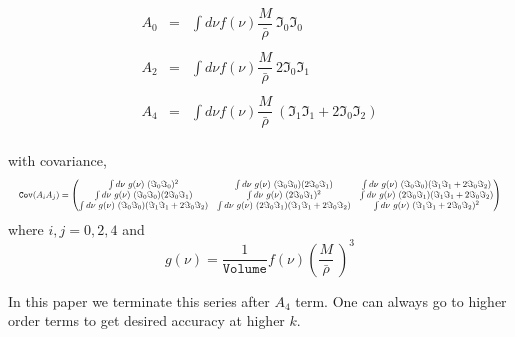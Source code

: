 \documentclass[
  11pt,
  twoside,
  openright,
  titlepage,
  headings=optiontoheadandtoc
]{scrbook}
\begin{document}
\clearpage

\begin{equation}
\begin{array}{lcl} 
A_0 & = & \int d\nu f(\nu) \dfrac{M}{\bar{\rho}}\ \Im_0\Im_0 \\ 
\\
A_2 & = & \int d\nu f(\nu) \dfrac{M}{\bar{\rho}}\ 2\Im_0\Im_1 \\ 
\\
A_4 & = & \int d\nu f(\nu) \dfrac{M}{\bar{\rho}}\ (\Im_1\Im_1 + 2\Im_0 \Im_2)
\end{array}
\label{p2:A024}
\end{equation}
\\
with covariance,
\\
\begin{equation}
\resizebox{\linewidth}{!}{$\displaystyle
\mathtt{Cov}(A_iA_j) = 
 \begin{pmatrix}
  \int d\nu\ g(\nu)\ (\Im_0\Im_0)^2
  & \int d\nu\ g(\nu)\ (\Im_0\Im_0) (2\Im_0\Im_1)
  & \int d\nu\ g(\nu)\ (\Im_0\Im_0) (\Im_1\Im_1 + 2\Im_0 \Im_2)\\


  \int d\nu\ g(\nu)\ (\Im_0\Im_0) (2\Im_0\Im_1) 
  & \int d\nu\ g(\nu)\ (2\Im_0\Im_1)^2
  &  \int d\nu\ g(\nu)\ (2\Im_0\Im_1) (\Im_1\Im_1 + 2\Im_0 \Im_2)\\


  \int d\nu\ g(\nu)\ (\Im_0\Im_0) (\Im_1\Im_1 + 2\Im_0 \Im_2)
  & \int d\nu\ g(\nu)\ (2\Im_0\Im_1) (\Im_1\Im_1 + 2\Im_0 \Im_2)
  &  \int d\nu\ g(\nu)\ (\Im_1\Im_1 + 2\Im_0 \Im_2)^2
 \end{pmatrix}
 $}
 \label{p2:eqn:covariance}
\end{equation}
where $i,j=0,2,4$ and
\\
\begin{equation}
	g(\nu) = \dfrac{1}{\mathtt{Volume}} f(\nu) \left(\dfrac{M}{\bar{\rho}}\  \right)^3
\end{equation}



In this paper we terminate this series after $A_4$ term. One can always go to higher order terms to get desired accuracy at higher $k$.
\end{document}
